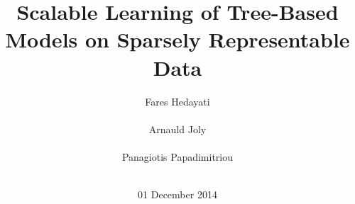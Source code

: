 \documentclass{acm_proc_article-sp}
\begin{document}
\title{Scalable Learning of Tree-Based Models on Sparsely Representable Data}

%
%
%
%
%

%
\author{
\alignauthor
Fares Hedayati\\
      \\
\alignauthor
Arnauld Joly\\
       \\
\alignauthor Panagiotis Papadimitriou\\
       \\
}
\date{01 December 2014}
\end{document}
